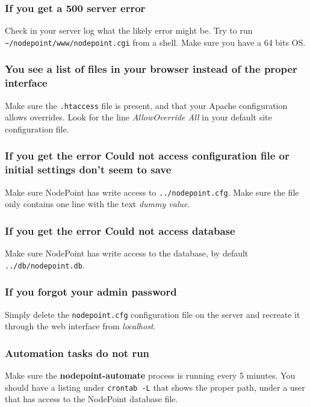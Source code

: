 \documentclass[11pt]{article}
\begin{document}
{
\subsubsection{If you get a 500 server error}

Check in your server log what the likely error might be. Try to run \texttt{\textasciitilde/nodepoint/www/nodepoint.cgi} from a shell. Make sure you have a 64 bits OS.

\subsubsection{You see a list of files in your browser instead of the proper interface}

Make sure the \texttt{.htaccess} file is present, and that your Apache configuration allows overrides. Look for the line \textit{AllowOverride All} in your default site configuration file.

\subsubsection{If you get the error Could not access configuration file or initial settings don't seem to save}

Make sure NodePoint has write access to \texttt{../nodepoint.cfg}. Make sure the file only contains one line with the text \textit{dummy value}.

\subsubsection{If you get the error Could not access database}

Make sure NodePoint has write access to the database, by default \texttt{../db/nodepoint.db}.

\subsubsection{If you forgot your admin password}

Simply delete the \texttt{nodepoint.cfg} configuration file on the server and recreate it through the web interface from \textit{localhost}.

\subsubsection{Automation tasks do not run}

Make sure the \textbf{nodepoint-automate} process is running every 5 minutes. You should have a listing under \texttt{crontab -L} that shows the proper path, under a user that has access to the NodePoint database file.
}
\end{document}
